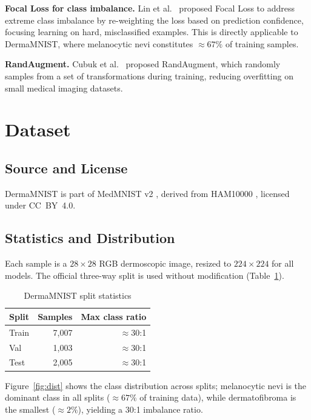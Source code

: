 \documentclass[conference]{IEEEtran}
\begin{document}
\textbf{Focal Loss for class imbalance.}
Lin et al.~\cite{lin2017focal} proposed Focal Loss to address extreme
class imbalance by re-weighting the loss based on prediction
confidence, focusing learning on hard, misclassified examples.
This is directly applicable to DermaMNIST, where melanocytic nevi
constitutes $\approx 67\%$ of training samples.

\textbf{RandAugment.}
Cubuk et al.~\cite{cubuk2020randaugment} proposed RandAugment, which
randomly samples from a set of transformations during training,
reducing overfitting on small medical imaging datasets.

\section{Dataset}

\subsection{Source and License}
DermaMNIST is part of MedMNIST v2 \cite{yang2023medmnist}, derived
from HAM10000 \cite{tschandl2018ham10000}, licensed under CC~BY~4.0.

\subsection{Statistics and Distribution}
Each sample is a $28\times28$ RGB dermoscopic image, resized to
$224\times224$ for all models. The official three-way split is
used without modification (Table~\ref{tab:dataset}).

\begin{table}[ht]
\centering
\caption{DermaMNIST split statistics}
\label{tab:dataset}
\begin{tabular}{lrr}
\toprule
\textbf{Split} & \textbf{Samples} & \textbf{Max class ratio} \\
\midrule
Train   & 7,007 & $\approx$30:1 \\
Val     & 1,003 & $\approx$30:1 \\
Test    & 2,005 & $\approx$30:1 \\
\bottomrule
\end{tabular}
\end{table}

Figure~\ref{fig:dist} shows the class distribution across splits;
melanocytic nevi is the dominant class in all splits ($\approx 67\%$
of training data), while dermatofibroma is the smallest
($\approx 2\%$), yielding a 30:1 imbalance ratio.
\end{document}
